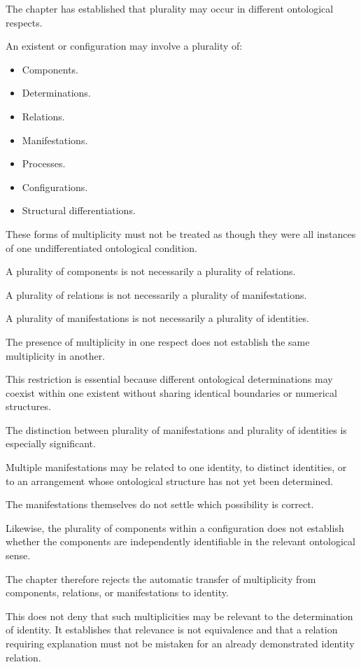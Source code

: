 The chapter has established
that plurality may occur in
different ontological respects.

An existent or configuration
may involve a plurality of:

\begin{itemize}
    \item Components.
    \item Determinations.
    \item Relations.
    \item Manifestations.
    \item Processes.
    \item Configurations.
    \item Structural differentiations.
\end{itemize}

These forms of multiplicity
must not be treated as though
they were all instances of
one undifferentiated ontological
condition.

A plurality of components is
not necessarily a plurality
of relations.

A plurality of relations is
not necessarily a plurality
of manifestations.

A plurality of manifestations
is not necessarily a plurality
of identities.

The presence of multiplicity
in one respect does not establish
the same multiplicity in another.

This restriction is essential
because different ontological
determinations may coexist
within one existent without
sharing identical boundaries
or numerical structures.

The distinction between plurality
of manifestations and plurality
of identities is especially
significant.

Multiple manifestations may
be related to one identity,
to distinct identities, or
to an arrangement whose
ontological structure has not
yet been determined.

The manifestations themselves
do not settle which possibility
is correct.

Likewise, the plurality of
components within a configuration
does not establish whether
the components are independently
identifiable in the relevant
ontological sense.

The chapter therefore rejects
the automatic transfer of
multiplicity from components,
relations, or manifestations
to identity.

This does not deny that such
multiplicities may be relevant
to the determination of identity.
It establishes that relevance
is not equivalence and that
a relation requiring explanation
must not be mistaken for an
already demonstrated identity
relation.

